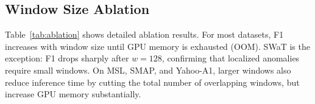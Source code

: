 \documentclass[runningheads]{llncs}
\begin{document}
\subsection{Window Size Ablation}

Table~\ref{tab:ablation} shows detailed ablation results. For most datasets, F1 increases with window size until GPU memory is exhausted (OOM). SWaT is the exception: F1 drops sharply after $w=128$, confirming that localized anomalies require small windows. On MSL, SMAP, and Yahoo-A1, larger windows also reduce inference time by cutting the total number of overlapping windows, but increase GPU memory substantially.

\begin{table}[H]
\centering
\caption{Window size ablation results on seven benchmark datasets.
Entries marked \textsf{---} were not evaluated.
\textsf{OOM} indicates configurations that exceeded
the 16\,GB Tesla T4 memory limit.
Bold rows indicate the best-performing configuration per dataset.}
\label{tab:ablation}
\end{table}
\end{document}
